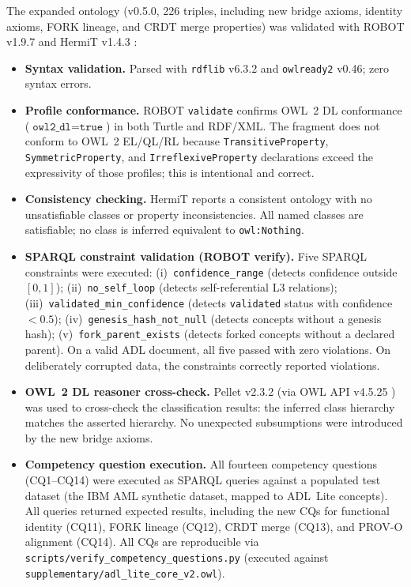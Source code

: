 The expanded ontology (v0.5.0, 226 triples, including new bridge axioms, identity axioms, FORK lineage, and CRDT merge properties) was validated with ROBOT v1.9.7 \cite{jackson2019robot} and HermiT v1.4.3 \cite{glimm2014hermit}:
\begin{itemize}[leftmargin=2em]
    \item \textbf{Syntax validation.} Parsed with \texttt{rdflib} v6.3.2 and \texttt{owlready2} v0.46; zero syntax errors.
    \item \textbf{Profile conformance.} ROBOT \texttt{validate} confirms OWL~2 DL conformance ($\texttt{owl2\_dl}=\texttt{true}$) in both Turtle and RDF/XML. The fragment does not conform to OWL~2 EL/QL/RL because \texttt{TransitiveProperty}, \texttt{SymmetricProperty}, and \texttt{IrreflexiveProperty} declarations exceed the expressivity of those profiles; this is intentional and correct.
    \item \textbf{Consistency checking.} HermiT reports a consistent ontology with no unsatisfiable classes or property inconsistencies. All named classes are satisfiable; no class is inferred equivalent to \texttt{owl:Nothing}.
    \item \textbf{SPARQL constraint validation (ROBOT verify).} Five SPARQL constraints were executed: (i)~\texttt{confidence\_range} (detects confidence outside $[0,1]$); (ii)~\texttt{no\_self\_loop} (detects self-referential L3 relations); (iii)~\texttt{validated\_min\_confidence} (detects \texttt{validated} status with confidence $< 0.5$); (iv)~\texttt{genesis\_hash\_not\_null} (detects concepts without a genesis hash); (v)~\texttt{fork\_parent\_exists} (detects forked concepts without a declared parent). On a valid ADL document, all five passed with zero violations. On deliberately corrupted data, the constraints correctly reported violations.
    \item \textbf{OWL~2 DL reasoner cross-check.} Pellet v2.3.2 (via OWL API v4.5.25 \cite{horridge2011owl}) was used to cross-check the classification results: the inferred class hierarchy matches the asserted hierarchy. No unexpected subsumptions were introduced by the new bridge axioms.
    \item \textbf{Competency question execution.} All fourteen competency questions (CQ1--CQ14) were executed as SPARQL queries against a populated test dataset (the IBM AML synthetic dataset, mapped to ADL~Lite concepts). All queries returned expected results, including the new CQs for functional identity (CQ11), FORK lineage (CQ12), CRDT merge (CQ13), and PROV-O alignment (CQ14). All CQs are reproducible via \texttt{scripts/verify\_competency\_questions.py} (executed against \texttt{supplementary/adl\_lite\_core\_v2.owl}).
\end{itemize}


